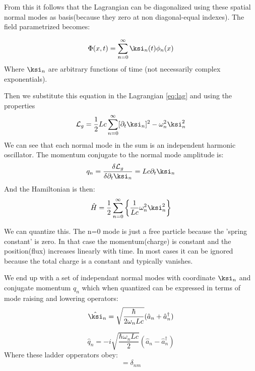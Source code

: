 \documentclass[12pt]{article}
\numberwithin{equation}{subsection}
\begin{document}
From this it follows that the Lagrangian can be diagonalized using these spatial normal modes as basis(because they zero at non diagonal-equal indexes). The field parametrized becomes:

\begin{equation}
    \Phi (x,t) = \sum ^\infty _{n=0} \ksi_n(t)\phi_n(x)
\end{equation}
Where $\ksi_n$ are arbitrary functions of time (not necessarily complex exponentials).

Then we substitute this equation in the Lagrangian \ref{eq:lag} and using the properties
\begin{equation}
    \mathcal L_g = \frac{1}{2} Lc\sum^\infty_{n=0} [\partial_t \ksi_n]^2 - \omega^2_n \ksi^2_n
\end{equation}
We can see that each normal mode in the sum is an independent harmonic oscillator. The momentum conjugate to the normal mode amplitude is:
\begin{equation}
    q_n = \frac{\delta\mathcal L_g}{\delta\partial_t\ksi_n} = Lc\partial_t\ksi_n
\end{equation}
And the Hamiltonian is then:
\begin{equation}
  \hat  H = \frac{1}{2} \sum^\infty_{n=0} \left\{ \frac{1}{Lc}\omega_n^2\ksi_n^2 \right\}
\end{equation}

We can quantize this. The n=0 mode is just a free particle because the 'spring constant' is zero. In that case the momentum(charge) is constant and the position(flux) increases linearly with time. In most cases it can be ignored because the total charge is a constant and typically vanishes.

We end up with a set of independant normal modes with coordinate $\ksi_n$ and conjugate momentum $q_n$ which when quantized can be expressed in terms of mode raising and lowering operators:
\begin{equation}
   \hat \ksi_n = \sqrt{\frac{\hbar}{2\omega_nLc}}(\hat a_n+\hat a _n^\dagger)
\end{equation}

\begin{equation}
   \hat q_n = -i \sqrt{\frac{\hbar\omega_nLc}{2}}(\hat a_n-\hat a _n^\dagger)
\end{equation}
Where these ladder opperators obey:
\begin{equation}
[\hat a_n, \hat a_n^\dagger] = \delta_{nm}   
\end{equation}
\end{document}
